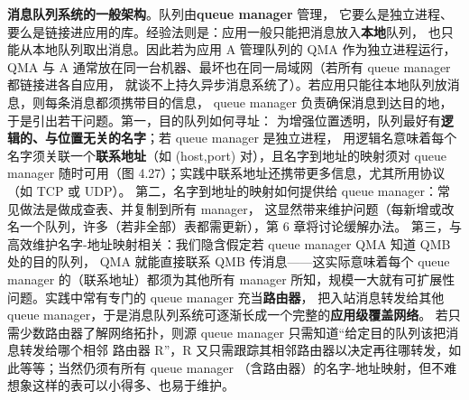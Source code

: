 \medskip\noindent\textbf{消息队列系统的一般架构}。队列由\textbf{queue manager} 管理，
它要么是独立进程、要么是链接进应用的库。经验法则是：应用一般只能把消息放入\textbf{本地}队列，
也只能从本地队列取出消息。因此若为应用 A 管理队列的 QMA 作为独立进程运行，
QMA 与 A 通常放在同一台机器、最坏也在同一局域网（若所有 queue manager 都链接进各自应用，
就谈不上持久异步消息系统了）。若应用只能往本地队列放消息，则每条消息都须携带目的信息，
queue manager 负责确保消息到达目的地，于是引出若干问题。第一，目的队列如何寻址：
为增强位置透明，队列最好有\textbf{逻辑的、与位置无关的名字}；若 queue manager 是独立进程，
用逻辑名意味着每个名字须关联一个\textbf{联系地址}（如 (host,port) 对），且名字到地址的映射须对
queue manager 随时可用（图 4.27）；实践中联系地址还携带更多信息，尤其所用协议（如 TCP 或 UDP）。
第二，名字到地址的映射如何提供给 queue manager：常见做法是做成查表、并复制到所有 manager，
这显然带来维护问题（每新增或改名一个队列，许多（若非全部）表都需更新），第 6 章将讨论缓解办法。
第三，与高效维护名字-地址映射相关：我们隐含假定若 queue manager QMA 知道 QMB 处的目的队列，
QMA 就能直接联系 QMB 传消息——这实际意味着每个 queue manager 的（联系地址）都须为其他所有
manager 所知，规模一大就有可扩展性问题。实践中常有专门的 queue manager 充当\textbf{路由器}，
把入站消息转发给其他 queue manager，于是消息队列系统可逐渐长成一个完整的\textbf{应用级覆盖网络}。
若只需少数路由器了解网络拓扑，则源 queue manager 只需知道“给定目的队列该把消息转发给哪个相邻
路由器 R”，R 又只需跟踪其相邻路由器以决定再往哪转发，如此等等；当然仍须有所有 queue manager
（含路由器）的名字-地址映射，但不难想象这样的表可以小得多、也易于维护。

